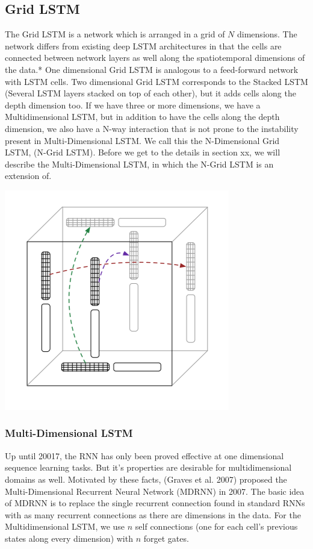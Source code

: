 \documentclass{article} %
\begin{document}
\subsection{Grid LSTM}
The Grid LSTM \cite{Kalchbrenner} is a network which is arranged in a grid of $N$ dimensions. The network differs from existing deep LSTM architectures in that the cells are connected between network layers as well along the spatiotemporal dimensions of the data.* One dimensional Grid LSTM is analogous to a feed-forward network with LSTM cells. Two dimensional Grid LSTM corresponds to the Stacked LSTM (Several LSTM layers stacked on top of each other), but it adds cells along the depth dimension too. If we have three or more dimensions, we have a Multidimensional LSTM, but in addition to have the cells along the depth dimension, we also have a N-way interaction that is not prone to the instability present in Multi-Dimensional LSTM. We call this the N-Dimensional Grid LSTM, (N-Grid LSTM). Before we get to the details in section xx, we will describe the Multi-Dimensional LSTM, in which the N-Grid LSTM is an extension of.

\newline
\includegraphics[scale=0.6]{3DGridLSTM} \newline

\subsubsection{Multi-Dimensional LSTM}
Up until 20017, the RNN has only been proved effective at one dimensional sequence learning tasks. But it's properties are desirable for multidimensional domains as well. Motivated by these facts, (Graves et al. 2007) \cite{Graves} proposed the Multi-Dimensional Recurrent Neural Network (MDRNN) in 2007. The basic idea of MDRNN is to replace the single recurrent connection found in standard RNNs with as many recurrent connections as there are dimensions in the data. For the Multidimensional LSTM, we use $n$ self connections (one for each cell's previous states along every dimension) with $n$ forget gates. 
\end{document}
